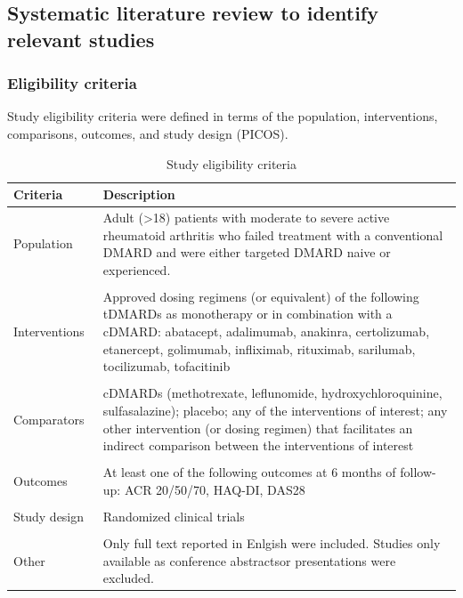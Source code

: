 \documentclass[11pt,final,fleqn]{article}\usepackage[]{graphicx}\usepackage[]{color}
\theoremstyle{plain}
\begin{document}
\begin{appendices}
\subsection{Systematic literature review to identify relevant studies}\label{systematic-literature-review}
\subsubsection{Eligibility criteria}
Study eligibility criteria were defined in terms of the population, interventions, comparisons, outcomes, and study design (PICOS).

\begin{table}[!ht]
\begin{center}
\scriptsize
\begin{threeparttable}
\caption{Study eligibility criteria} \label{tbl:study-eligibility}
\begin{tabular}{p{0.20\linewidth}p{0.80\linewidth}}
\hline
\multicolumn{1}{l}{Criteria} & \multicolumn{1}{l}{Description}\\
\hline
Population & Adult (>18) patients with moderate to severe active rheumatoid arthritis who failed treatment with a conventional DMARD and were either targeted DMARD naive or experienced. \\
&\\
Interventions & Approved dosing regimens (or equivalent) of the following tDMARDs as monotherapy or in combination with a cDMARD: abatacept, adalimumab, anakinra, certolizumab, etanercept, golimumab, infliximab, rituximab, sarilumab, tocilizumab, tofacitinib \\
& \\
Comparators & cDMARDs (methotrexate, leflunomide, hydroxychloroquinine, sulfasalazine); placebo; any of the interventions of interest; any other intervention (or dosing regimen) that facilitates an indirect comparison between the interventions of interest \\
&\\
Outcomes & At least one of the following outcomes at 6 months of follow-up: ACR 20/50/70, HAQ-DI, DAS28 \\
&\\
Study design & Randomized clinical trials \\
&\\
Other & Only full text reported in Enlgish were included. Studies only available as conference abstractsor presentations were excluded. \\
\hline
\end{tabular}
\scriptsize
\end{threeparttable}
\end{center}
\end{table}


\end{appendices}
\end{document}
